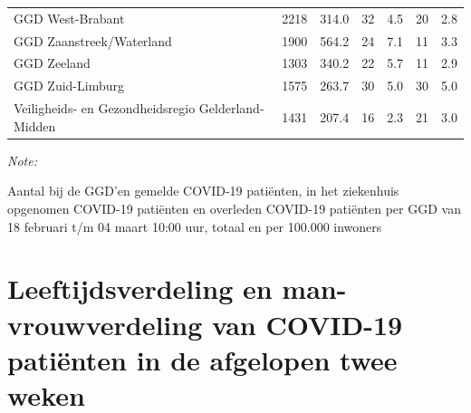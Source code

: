 \documentclass[
  english,
  man,floatsintext]{apa6}
\begin{document}
\begin{table}
\begin{threeparttable}
\begin{tabular}{lrrrrrr}
GGD West-Brabant & 2218 & 314.0 & 32 & 4.5 & 20 & 2.8\\
GGD Zaanstreek/Waterland & 1900 & 564.2 & 24 & 7.1 & 11 & 3.3\\
GGD Zeeland & 1303 & 340.2 & 22 & 5.7 & 11 & 2.9\\
GGD Zuid-Limburg & 1575 & 263.7 & 30 & 5.0 & 30 & 5.0\\
Veiligheids- en Gezondheidsregio Gelderland-Midden & 1431 & 207.4 & 16 & 2.3 & 21 & 3.0\\
\bottomrule
\end{tabular}
\begin{tablenotes}
\item \textit{Note: } 
\item Aantal bij de GGD’en gemelde COVID-19 patiënten, in het ziekenhuis opgenomen COVID-19 patiënten en overleden COVID-19 patiënten per GGD van 18 februari t/m 04 maart 10:00 uur, totaal en per 100.000 inwoners
\end{tablenotes}
\end{threeparttable}
\endgroup{}
\end{table}

\newpage

\hypertarget{leeftijdsverdeling-en-man-vrouwverdeling-van-covid-19-patiuxebnten-in-de-afgelopen-twee-weken}{%
\section{Leeftijdsverdeling en man-vrouwverdeling van COVID-19 patiënten in de afgelopen twee weken}\label{leeftijdsverdeling-en-man-vrouwverdeling-van-covid-19-patiuxebnten-in-de-afgelopen-twee-weken}}
\end{document}
